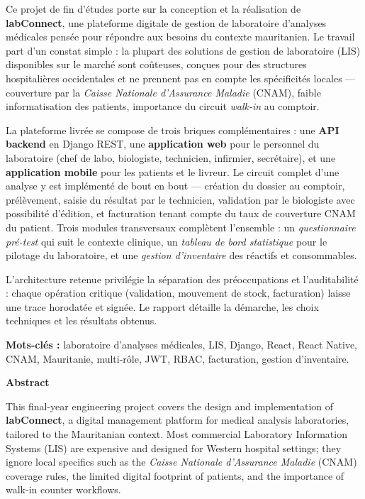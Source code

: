\documentclass[12pt, a4paper, oneside]{report}
\begin{document}
Ce projet de fin d'études porte sur la conception et la réalisation de
\textbf{labConnect}, une plateforme digitale de gestion de laboratoire
d'analyses médicales pensée pour répondre aux besoins du contexte
mauritanien. Le travail part d'un constat simple : la plupart des
solutions de gestion de laboratoire (LIS) disponibles sur le marché sont
coûteuses, conçues pour des structures hospitalières occidentales et ne
prennent pas en compte les spécificités locales — couverture par la
\textit{Caisse Nationale d'Assurance Maladie} (CNAM), faible
informatisation des patients, importance du circuit \emph{walk-in} au
comptoir.

La plateforme livrée se compose de trois briques complémentaires :
une \textbf{API backend} en Django REST, une \textbf{application web}
pour le personnel du laboratoire (chef de labo, biologiste, technicien,
infirmier, secrétaire), et une \textbf{application mobile} pour les
patients et le livreur. Le circuit complet d'une analyse y est
implémenté de bout en bout — création du dossier au comptoir, prélèvement,
saisie du résultat par le technicien, validation par le biologiste avec
possibilité d'édition, et facturation tenant compte du taux de couverture
CNAM du patient. Trois modules transversaux complètent l'ensemble :
un \emph{questionnaire pré-test} qui suit le contexte clinique, un
\emph{tableau de bord statistique} pour le pilotage du laboratoire, et
une \emph{gestion d'inventaire} des réactifs et consommables.

L'architecture retenue privilégie la séparation des préoccupations et
l'auditabilité : chaque opération critique (validation, mouvement de
stock, facturation) laisse une trace horodatée et signée. Le rapport
détaille la démarche, les choix techniques et les résultats obtenus.

\vspace{1em}
\noindent\textbf{Mots-clés :} laboratoire d'analyses médicales, LIS,
Django, React, React Native, CNAM, Mauritanie, multi-rôle, JWT, RBAC,
facturation, gestion d'inventaire.

\vspace{2em}
\noindent\textbf{\Large Abstract}
\vspace{0.5em}

This final-year engineering project covers the design and implementation
of \textbf{labConnect}, a digital management platform for medical
analysis laboratories, tailored to the Mauritanian context. Most
commercial Laboratory Information Systems (LIS) are expensive and
designed for Western hospital settings; they ignore local specifics such
as the \emph{Caisse Nationale d'Assurance Maladie} (CNAM) coverage rules,
the limited digital footprint of patients, and the importance of
walk-in counter workflows.
\end{document}
